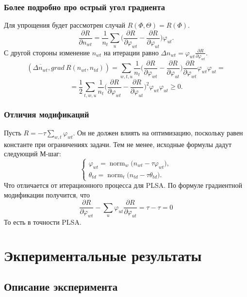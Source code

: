 \documentclass[utf8]{beamer}
\DeclareMathOperator{\norm}{norm}
\renewcommand{\geq}{\geqslant}
\renewcommand{\phi}{\varphi}
\begin{document}
\begin{frame}
\frametitle{Более подробно про острый угол градиента}

Для упрощения будет рассмотрен случай $R(\Phi, \Theta) = R(\Phi)$.
\[
\frac{\partial{R}}{\partial{n_{wt}}}  = \frac{1}{n_t} \sum_{u} \bigg(\frac{\partial{R}}{\partial{\phi_{wt}}}  -  \frac{\partial{R}}{\partial{\phi_{ut}}} \bigg)  \phi_{ut}.
\]
С другой стороны изменение $n_{wt}$ на итерации равно $ \Delta n_{wt} =  \phi_{wt} \frac{\partial{R}}{\partial{\phi_{wt}}}$.
\[
(\overline{\Delta n_{wt}}, grad\ R(n_{wt}, n_{td})) = \sum\limits_{w, t, u}  \frac{1}{n_{t}}  \bigg(  \frac{\partial{R}}{\partial{\phi_{wt}}}  -  \frac{\partial{R}}{\partial{\phi_{ut}}}  \bigg)  \frac{\partial{R}}{\partial{\phi_{wt}}} \phi_{wt} \phi_{ut}  = 
\]
\[
= \frac12  \sum\limits_{t, w, u}  \frac{1}{n_{t}} \bigg(  \frac{\partial{R}}{\partial{\phi_{wt}}}  -  \frac{\partial{R}}{\partial{\phi_{ut}}}  \bigg)^2 \phi_{wt} \phi_{ut}  \geq 0.
\]
\end{frame}


\begin{frame}
\frametitle{Отличия модификаций}

Пусть $R = -\tau \sum_{w, t} \phi_{wt}$. Он не должен влиять на оптимизацию, поскольку равен константе при ограничениях задачи. Тем не менее, исходные формулы дадут следующий М-шаг:
\[
\left\{
	\begin{aligned}
		\phi_{wt} = \norm_w \big( n_{wt} - \tau \phi_{wt}\big),\\
		\theta_{td} = \norm_t \big( n_{td} - \tau \theta_{td}\big).
	\end{aligned}
\right.
\]
Что отличается от итерационного процесса для  PLSA. По формуле градиентной модификации получится, что 
\[
\frac{\partial{R}}{\partial{\phi_{wt}}} - \sum\limits_u \phi_{ut} \frac{\partial{R}}{\partial{\phi_{ut}}} = \tau - \tau =0
\]
То есть в точности PLSA.
\end{frame}


\section{Экпериментальные результаты}
\subsection{Описание эксперимента}
	
\end{document}
